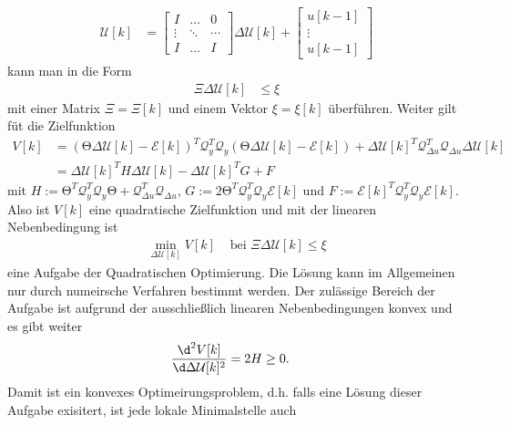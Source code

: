 \begin{align*}
\mathcal{U}[k] & = \begin{bmatrix}
I & \ldots & 0\\
\vdots & \ddots & \cdots\\
I & \ldots & I
\end{bmatrix}\Delta\mathcal{U}[k]+\begin{bmatrix}
u[k-1]\\ \vdots\\ u[k-1]
\end{bmatrix}
\end{align*}
kann man  in die Form
\begin{align}
	\Xi\Delta\mathcal{U}[k] & \le \xi\label{eqn:kap_4_lin_nebenbedinung_form}
\end{align}
mit einer Matrix $\Xi=\Xi[k]$ und einem Vektor $\xi = \xi[k]$ überführen. Weiter gilt füt die Zielfunktion
\begin{align*}
	V[k] & = \left( \mathrm{\Theta}\Delta\mathcal{U}[k]-\mathcal{E}[k] \right)^T\mathcal{Q}_y^T\mathcal{Q}_y\left( \mathrm{\Theta}\Delta\mathcal{U}[k]-\mathcal{E}[k]
	\right)+\Delta\mathcal{U}[k]^T\mathcal{Q}^T_{\Delta u}\mathcal{Q}_{\Delta u}\Delta\mathcal{U}[k]\\
	& = \Delta\mathcal{U}[k]^T H \Delta\mathcal{U}[k]-\Delta\mathcal{U}[k]^TG+F
\end{align*}
mit $H:=\mathrm{\Theta}^T\mathcal{Q}_y^T\mathcal{Q}_y\mathrm{\Theta}+\mathcal{Q}^T_{\Delta u}\mathcal{Q}_{\Delta u}$,
$G:=2\mathrm{\Theta}^T\mathcal{Q}_y^T\mathcal{Q}_y\mathcal{E}[k]$ und $F:=\mathcal{E}[k]^T\mathcal{Q}_y^T\mathcal{Q}_y\mathcal{E}[k]$. Also ist $V[k]$ eine quadratische Zielfunktion und
mit der linearen Nebenbedingung  ist
\begin{align}
	\min\limits_{\Delta\mathcal{U}[k]}V[k] & \text{ bei } \Xi\Delta\mathcal{U}[k]\le \xi\label{eqn:kap_4_quad_opt_aufgabe_lin_nebenbedingungen}
\end{align}
eine Aufgabe der Quadratischen Optimierung. Die Lösung kann im Allgemeinen nur durch numeirsche Verfahren bestimmt werden. Der zulässige Bereich der Aufgabe ist aufgrund der
ausschließlich linearen Nebenbedingungen konvex und es gibt weiter
\begin{align*}
\frac{\d^2 V[k]}{\d\Delta\mathcal{U}[k]^2} & = 2 H \ge 0.
\end{align*}
Damit ist  ein konvexes Optimeirungsproblem, d.h. falls eine Lösung dieser Aufgabe exisitert, ist jede lokale Minimalstelle auch
